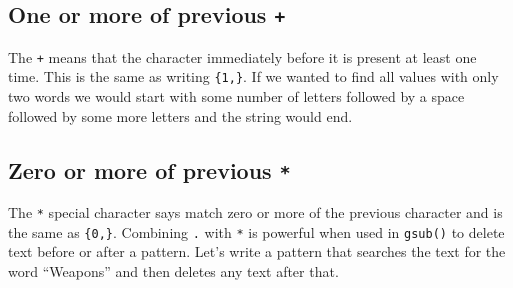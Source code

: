 \documentclass[
  12pt,
]{book}
\newenvironment{Shaded}{\begin{snugshade}}{\end{snugshade}}
\newcommand{\CommentTok}[1]{\textcolor[rgb]{0.56,0.35,0.01}{\textit{#1}}}
\newcommand{\DataTypeTok}[1]{\textcolor[rgb]{0.13,0.29,0.53}{#1}}
\newcommand{\KeywordTok}[1]{\textcolor[rgb]{0.13,0.29,0.53}{\textbf{#1}}}
\newcommand{\NormalTok}[1]{#1}
\newcommand{\OtherTok}[1]{\textcolor[rgb]{0.56,0.35,0.01}{#1}}
\newcommand{\StringTok}[1]{\textcolor[rgb]{0.31,0.60,0.02}{#1}}
\begin{document}
\hypertarget{one-or-more-of-previous}{%
\subsection{\texorpdfstring{One or more of previous \texttt{+}}{One or more of previous +}}\label{one-or-more-of-previous}}

The \texttt{+} means that the character immediately before it is present at least one time. This is the same as writing \texttt{\{1,\}}. If we wanted to find all values with only two words we would start with some number of letters followed by a space followed by some more letters and the string would end.

\begin{Shaded}
\end{Shaded}

\hypertarget{zero-or-more-of-previous}{%
\subsection{\texorpdfstring{Zero or more of previous \texttt{*}}{Zero or more of previous *}}\label{zero-or-more-of-previous}}

The \texttt{*} special character says match zero or more of the previous character and is the same as \texttt{\{0,\}}. Combining \texttt{.} with \texttt{*} is powerful when used in \texttt{gsub()} to delete text before or after a pattern. Let's write a pattern that searches the text for the word ``Weapons'' and then deletes any text after that.
\end{document}

